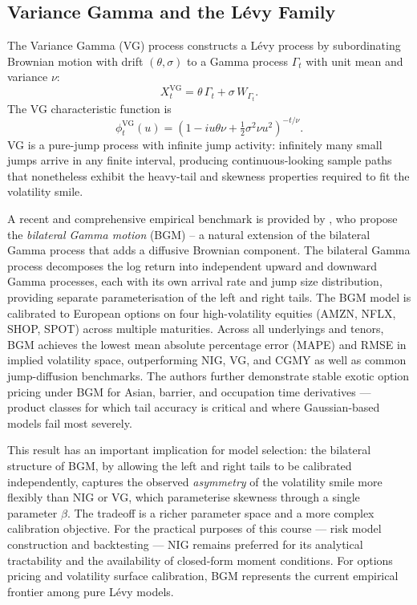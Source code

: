 \documentclass[12pt, a4paper]{article}
\begin{document}
\subsection{Variance Gamma and the L\'{e}vy Family}

The Variance Gamma (VG) process \citep{madan1998vg} constructs a
L\'{e}vy process by subordinating Brownian motion with drift
$(\theta, \sigma)$ to a Gamma process $\Gamma_t$ with unit mean and
variance $\nu$:
\begin{equation}
  X_t^{\mathrm{VG}} = \theta\,\Gamma_t + \sigma\,W_{\Gamma_t}.
  \label{eq:vg}
\end{equation}
The VG characteristic function is
\begin{equation}
  \phi_t^{\mathrm{VG}}(u) =
  \left(1 - iu\theta\nu + \tfrac{1}{2}\sigma^2\nu u^2\right)^{-t/\nu}.
  \label{eq:vg_cf}
\end{equation}
VG is a pure-jump process with infinite jump activity: infinitely many
small jumps arrive in any finite interval, producing continuous-looking
sample paths that nonetheless exhibit the heavy-tail and skewness
properties required to fit the volatility smile.

A recent and comprehensive empirical benchmark is provided by
\citet{bgm2024}, who propose the \emph{bilateral Gamma motion}
(BGM) -- a natural extension of the bilateral Gamma process that
adds a diffusive Brownian component. The bilateral Gamma process
decomposes the log return into independent upward and downward Gamma
processes, each with its own arrival rate and jump size distribution,
providing separate parameterisation of the left and right tails. The
BGM model is calibrated to European options on four high-volatility
equities (AMZN, NFLX, SHOP, SPOT) across multiple maturities.
Across all underlyings and tenors, BGM achieves the lowest mean
absolute percentage error (MAPE) and RMSE in implied volatility
space, outperforming NIG, VG, and CGMY as well as common
jump-diffusion benchmarks. The authors further demonstrate stable
exotic option pricing under BGM for Asian, barrier, and occupation
time derivatives --- product classes for which tail accuracy is
critical and where Gaussian-based models fail most severely.

This result has an important implication for model selection: the
bilateral structure of BGM, by allowing the left and right tails to
be calibrated independently, captures the observed \emph{asymmetry}
of the volatility smile more flexibly than NIG or VG, which
parameterise skewness through a single parameter $\beta$. The
tradeoff is a richer parameter space and a more complex calibration
objective. For the practical purposes of this course --- risk
model construction and backtesting --- NIG remains preferred for its
analytical tractability and the availability of closed-form moment
conditions. For options pricing and volatility surface calibration,
BGM represents the current empirical frontier among pure L\'{e}vy
models.
\end{document}
